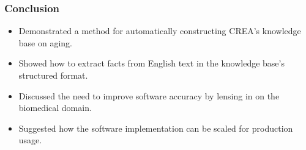 \documentclass[mathserif]{beamer}
\begin{document}
\begin{frame}

\frametitle{Conclusion}

\begin{itemize}[<+->]

\item Demonstrated a method for automatically constructing CREA's
knowledge base on aging.
\item Showed how to extract facts from English text in the knowledge
base's structured format.
\item Discussed the need to improve software accuracy by lensing in on
the biomedical domain.
\item Suggested how the software implementation can be scaled for
production usage.

\end{itemize}

\end{frame}
\end{document}
